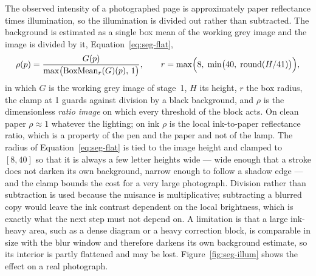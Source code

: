 The observed intensity of a photographed page is approximately paper reflectance times illumination, so the illumination is divided out rather than subtracted.
The background is estimated as a single box mean of the working grey image and the image is divided by it, Equation~\ref{eq:seg-flat},
\begin{equation}
\rho(p)=\frac{G(p)}{\max\bigl(\mathrm{BoxMean}_r(G)(p),\,1\bigr)},\qquad r=\max\Bigl(8,\;\min\bigl(40,\;\mathrm{round}(H/41)\bigr)\Bigr),
\label{eq:seg-flat}
\end{equation}
in which $G$ is the working grey image of stage~1, $H$ its height, $r$ the box radius, the clamp at 1 guards against division by a black background, and $\rho$ is the dimensionless \emph{ratio image} on which every threshold of the block acts.
On clean paper $\rho\approx1$ whatever the lighting; on ink $\rho$ is the local ink-to-paper reflectance ratio, which is a property of the pen and the paper and not of the lamp.
The radius of Equation~\ref{eq:seg-flat} is tied to the image height and clamped to $[8,40]$ so that it is always a few letter heights wide --- wide enough that a stroke does not darken its own background, narrow enough to follow a shadow edge --- and the clamp bounds the cost for a very large photograph.
Division rather than subtraction is used because the nuisance is multiplicative; subtracting a blurred copy would leave the ink contrast dependent on the local brightness, which is exactly what the next step must not depend on.
A limitation is that a large ink-heavy area, such as a dense diagram or a heavy correction block, is comparable in size with the blur window and therefore darkens its own background estimate, so its interior is partly flattened and may be lost.
Figure~\ref{fig:seg-illum} shows the effect on a real photograph.

\label{fig:seg-illum}

